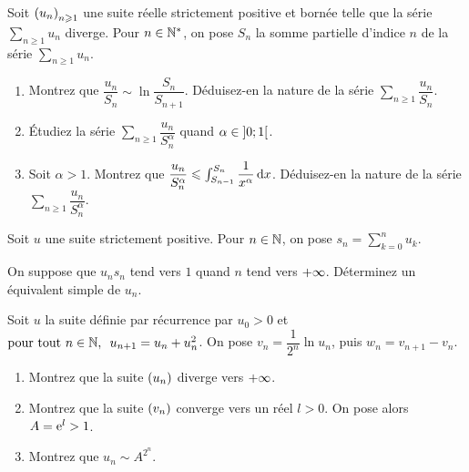 \begin{corr}
\end{corr}

\begin{exoss}[Exercice 17]
Soit \(\left(u_n\right)_{n\geqslant1}\) une suite réelle strictement positive et bornée telle que la série \(\sum_{n\geq1}u_n\) diverge. Pour \(n\in\mathbb{N}^*\), on pose \(S_n\) la somme partielle d'indice \(n\) de la série \(\sum_{n\geq1}u_n\).

\begin{enumerate}
    \item Montrez que \(\dfrac{u_n}{S_n}\sim\ln\dfrac{S_n}{S_{n+1}}\). Déduisez-en la nature de la série \(\sum_{n\geq1}\dfrac{u_n}{S_n}\). \\
    \item Étudiez la série \(\sum_{n\geq1}\dfrac{u_n}{S_n^\alpha}\) quand \(\alpha\in\left]0;1\right[\). \\
    \item Soit \(\alpha>1\). Montrez que \(\dfrac{u_n}{S_n^\alpha}\leq\int_{S_{n-1}}^{S_n}\dfrac{1}{x^\alpha}\odif{x}\). Déduisez-en la nature de la série \(\sum_{n\geq1}\dfrac{u_n}{S_n^\alpha}\).
\end{enumerate}
\end{exoss}

\begin{corr}
\end{corr}

\begin{exoss}[Exercice 18]
Soit \(u\) une suite strictement positive. Pour \(n\in\mathbb{N}\), on pose \(s_n=\sum_{k=0}^nu_k\).

On suppose que \(u_ns_n\) tend vers \(1\) quand \(n\) tend vers \(+\infty\). Déterminez un équivalent simple de \(u_n\).
\end{exoss}

\begin{corr}
\end{corr}

\begin{exoss}[Exercice 19]
Soit \(u\) la suite définie par récurrence par \(u_0>0\) et \(\quantifs{\tpt n\in\N}u_{n+1}=u_n+u_n^2\). On pose \(v_n=\dfrac{1}{2^n}\ln u_n\), puis \(w_n=v_{n+1}-v_n\).

\begin{enumerate}
    \item Montrez que la suite \(\left(u_n\right)\) diverge vers \(+\infty\). \\
    \item Montrez que la suite \(\left(v_n\right)\) converge vers un réel \(l>0\). On pose alors \(A=\mathrm{e}^{l}>1\). \\
    \item Montrez que \(u_n\sim A^{2^n}\).
\end{enumerate}
\end{exoss}

